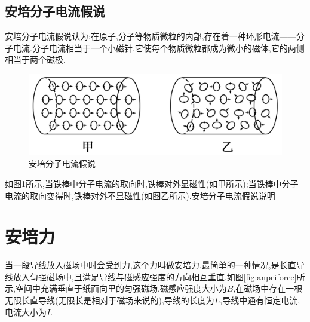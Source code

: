 \subsection{安培分子电流假说}

安培分子电流假说认为:在原子,分子等物质微粒的内部,存在着一种环形电流------分子电流.分子电流相当于一个小磁针,它使每个物质微粒都成为微小的磁体,它的两侧相当于两个磁极.

\begin{figure}[H]
  \centering
  \includegraphics{./cichang/图片6.png}
  \caption{安培分子电流假说}
  \label{fig:anpeiI}
\end{figure}

如图\ref{fig:anpeiI}所示,当铁棒中分子电流的取向时,铁棒对外显磁性(如甲所示);当铁棒中分子电流的取向变得时,铁棒对外不显磁性(如图乙所示).安培分子电流假说说明
\section{安培力}

当一段导线放入磁场中时会受到力,这个力叫做安培力.最简单的一种情况,是长直导线放入匀强磁场中,且满足导线与磁感应强度的方向相互垂直.如图\ref{fig:anpeiforce}所示,空间中充满垂直于纸面向里的匀强磁场,磁感应强度大小为$B$,在磁场中存在一根无限长直导线(无限长是相对于磁场来说的),导线的长度为$L$,导线中通有恒定电流,电流大小为$I$.

